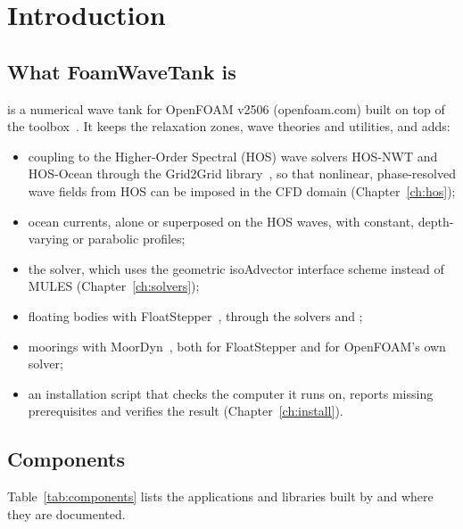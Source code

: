 \chapter{Introduction}
\label{ch:intro}

\section{What FoamWaveTank is}
\fwt{} is a numerical wave tank for OpenFOAM v2506 (openfoam.com) built on top of the
\wtwof{} toolbox~\cite{jacobsen2012wave}. It keeps the \wtwof{} relaxation zones, wave
theories and utilities, and adds:
\begin{itemize}
  \item coupling to the Higher-Order Spectral (HOS) wave solvers HOS-NWT and HOS-Ocean
        through the Grid2Grid library~\cite{choi2019grid2grid,aliyar2022numerical}, so that
        nonlinear, phase-resolved wave fields from HOS can be imposed in the CFD domain
        (Chapter~\ref{ch:hos});
  \item ocean currents, alone or superposed on the HOS waves, with constant, depth-varying
        or parabolic profiles;
  \item the  solver, which uses the geometric isoAdvector interface
        scheme instead of MULES (Chapter~\ref{ch:solvers});
  \item floating bodies with FloatStepper~\cite{roenby2024robust}, through the solvers
         and ;
  \item moorings with MoorDyn~\cite{aliyar2022numerical,chen2022cfd,hall2015validation}, both for FloatStepper and
        for OpenFOAM's own  solver;
  \item an installation script that checks the computer it runs on, reports missing
        prerequisites and verifies the result (Chapter~\ref{ch:install}).
\end{itemize}

\section{Components}
Table~\ref{tab:components} lists the applications and libraries built by 
and where they are documented.

